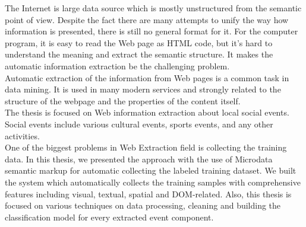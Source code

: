 \abstractpage

The Internet is large data source which is mostly unstructured from the semantic point of view. Despite the fact there are many attempts to unify the way how information is presented, there is still no general format for it. For the computer program, it is easy to read the Web page as HTML code, but it's hard to understand the meaning and extract the semantic structure. It makes the automatic information extraction be the challenging problem. \\

Automatic extraction of the information from Web pages is a common task in data mining. It is used in many modern services and strongly related to the structure of the webpage and the properties of the content itself.\\

The thesis is focused on Web information extraction about local social events. Social events include various cultural events, sports events, and any other activities. \\

One of the biggest problems in Web Extraction field is collecting the training data. In this thesis, we presented the approach with the use of Microdata semantic markup for automatic collecting the labeled training dataset. We built the system which automatically collects the training samples with comprehensive features including visual, textual, spatial and DOM-related. Also, this thesis is focused on various techniques on data processing, cleaning and building the classification model for every extracted event component.  
